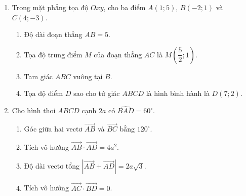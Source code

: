 \documentclass[10pt,a4paper]{article}
\begin{document}
\begin{enumerate}
\item Trong mặt phẳng tọa độ $Oxy$, cho ba điểm $A(1; 5)$, $B(-2; 1)$ và $C(4; -3)$.
\begin{enumerate}
    \item Độ dài đoạn thẳng $AB = 5$.
    \item Tọa độ trung điểm $M$ của đoạn thẳng $AC$ là $M\!\left(\dfrac{5}{2}; 1\right)$.
    \item Tam giác $ABC$ vuông tại $B$.
    \item Tọa độ điểm $D$ sao cho tứ giác $ABCD$ là hình bình hành là $D(7; 2)$.
\end{enumerate}

\item Cho hình thoi $ABCD$ cạnh $2a$ có $\widehat{BAD} = 60^\circ$.
\begin{enumerate}
    \item Góc giữa hai vectơ $\vec{AB}$ và $\vec{BC}$ bằng $120^\circ$.
    \item Tích vô hướng $\vec{AB} \cdot \vec{AD} = 4a^2$.
    \item Độ dài vectơ tổng $|\vec{AB} + \vec{AD}| = 2a\sqrt{3}$.
    \item Tích vô hướng $\vec{AC} \cdot \vec{BD} = 0$.
\end{enumerate}
\end{enumerate}
\pagebreak
\end{document}
